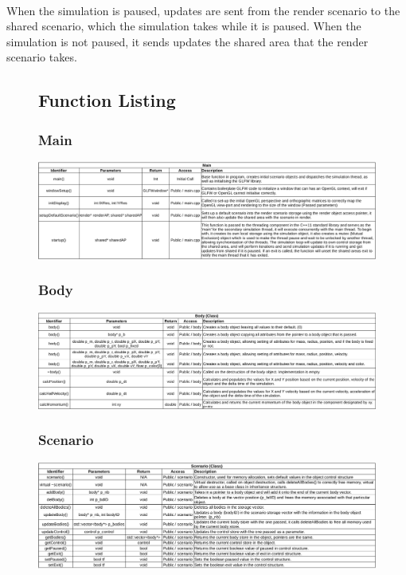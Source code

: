 \paragraph{}
When the simulation is paused, updates are sent from the render scenario to the shared scenario, which the simulation takes while it is paused. When the simulation is not paused, it sends updates the shared area that the render scenario takes.



\begin{figure}
\subsection{Function Listing}
  \subsubsection{Main}
  \centering  
  \includegraphics[width=\textwidth]{img/functions/main.png}
\end{figure}

\begin{figure}
  \subsubsection{Body}
  \centering  
  \includegraphics[width=\textwidth]{img/functions/body.png}
\end{figure}

\begin{figure}
  \subsubsection{Scenario}
  \centering  
  \includegraphics[width=\textwidth]{img/functions/scenario.png}
\end{figure}

